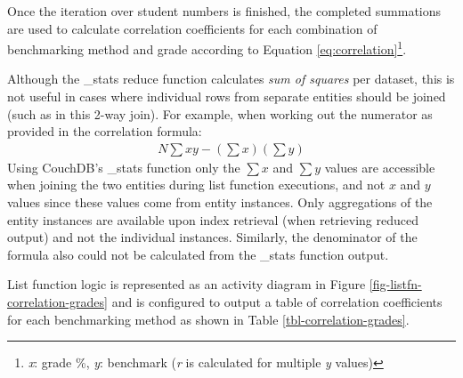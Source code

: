 Once the iteration over student numbers is finished, the completed summations are used to calculate correlation coefficients for each combination of benchmarking method and grade  according to Equation \ref{eq:correlation}\footnote{\textit{x}: grade \%, \textit{y}: benchmark (\textit{r} is calculated for multiple \textit{y} values)}.

Although the \_stats reduce function calculates \textit{sum of squares} per dataset, this is not useful in cases where individual rows from separate entities should be joined (such as in this 2-way join). For example, when working out the numerator as provided in the correlation formula:
\begin{align}
    N\sum{xy} - (\sum{x})(\sum{y})
\end{align}
Using CouchDB's \_stats function only the $\sum{x}$ and $\sum{y}$ values are accessible when joining the two entities during list function executions, and not $x$ and $y$ values since these values come from entity instances. Only aggregations of the entity instances are available upon index retrieval (when retrieving reduced output) and not the individual instances. Similarly, the denominator of the formula also could not be calculated from the \_stats function output.

List function logic is represented as an activity diagram in Figure \ref{fig-listfn-correlation-grades} and is configured to output a table of correlation coefficients for each benchmarking method as shown in Table \ref{tbl-correlation-grades}.

